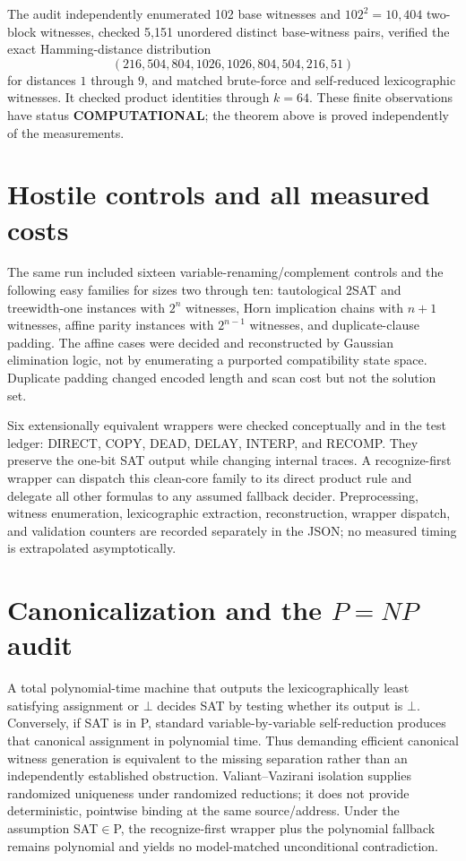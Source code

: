 \documentclass[11pt]{article}
\newcommand{\status}[1]{\textbf{#1}}
\begin{document}
The audit independently enumerated 102 base witnesses and $102^2=10{,}404$
two-block witnesses, checked 5,151 unordered distinct base-witness pairs,
verified the exact Hamming-distance distribution
\[
 (216,504,804,1026,1026,804,504,216,51)
\]
for distances $1$ through $9$, and matched brute-force and self-reduced
lexicographic witnesses.  It checked product identities through $k=64$.
These finite observations have status \status{COMPUTATIONAL}; the theorem
above is proved independently of the measurements.

\section*{Hostile controls and all measured costs}

The same run included sixteen variable-renaming/complement controls and the
following easy families for sizes two through ten: tautological 2SAT and
treewidth-one instances with $2^n$ witnesses, Horn implication chains with
$n+1$ witnesses, affine parity instances with $2^{n-1}$ witnesses, and
duplicate-clause padding.  The affine cases were decided and reconstructed by
Gaussian elimination logic, not by enumerating a purported compatibility
state space.  Duplicate padding changed encoded length and scan cost but not
the solution set.

Six extensionally equivalent wrappers were checked conceptually and in the
test ledger: DIRECT, COPY, DEAD, DELAY, INTERP, and RECOMP.  They preserve the
one-bit SAT output while changing internal traces.  A recognize-first wrapper
can dispatch this clean-core family to its direct product rule and delegate all
other formulas to any assumed fallback decider.  Preprocessing, witness
enumeration, lexicographic extraction, reconstruction, wrapper dispatch, and
validation counters are recorded separately in the JSON; no measured timing
is extrapolated asymptotically.

\section*{Canonicalization and the $P=NP$ audit}

A total polynomial-time machine that outputs the lexicographically least
satisfying assignment or $\bot$ decides SAT by testing whether its output is
$\bot$.  Conversely, if SAT is in P, standard variable-by-variable
self-reduction produces that canonical assignment in polynomial time.
Thus demanding efficient canonical witness generation is equivalent to the
missing separation rather than an independently established obstruction.
Valiant--Vazirani isolation supplies randomized uniqueness under randomized
reductions; it does not provide deterministic, pointwise binding at the same
source/address.  Under the assumption SAT$\in$P, the recognize-first wrapper
plus the polynomial fallback remains polynomial and yields no model-matched
unconditional contradiction.
\end{document}
